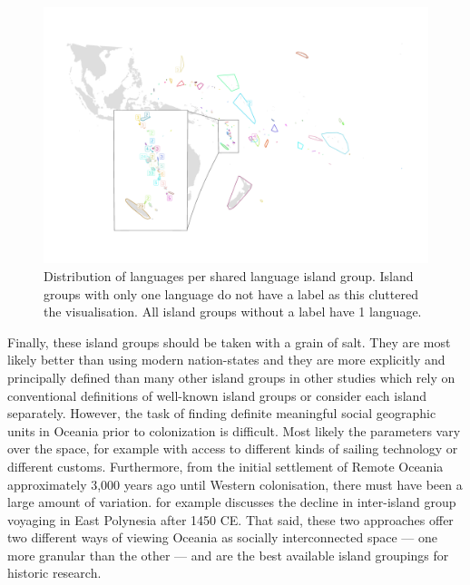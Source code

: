 \documentclass[12pt,letterpaper]{article}
\begin{document}
\begin{figure}
\centering
\includegraphics[width=\textwidth]{polygon_medium_group_map_vanuatu_mh_inset.png}
\caption{{Distribution of languages per shared language island group. Island groups with only one language do not have a label as this cluttered the visualisation. All island groups without a label have 1 language.}}
\label{polygon_plot_medium}
\end{figure}

Finally, these island groups should be taken with a grain of salt. They are most likely better than using modern nation-states and they are more explicitly and principally defined than many other island groups in other studies which rely on conventional definitions of well-known island groups or consider each island separately. However, the task of finding definite meaningful social geographic units in Oceania prior to colonization is difficult. Most likely the parameters vary over the space, for example with access to different kinds of sailing technology or different customs. Furthermore, from the initial settlement of Remote Oceania approximately 3,000 years ago until Western colonisation, there must have been a large amount of variation. \citep{rolett2002voyaging} for example discusses the decline in inter-island group voyaging in East Polynesia after 1450 CE. That said, these two approaches offer two different ways of viewing Oceania as socially interconnected space --- one more granular than the other --- and are the best available island groupings for historic research.
\end{document}
